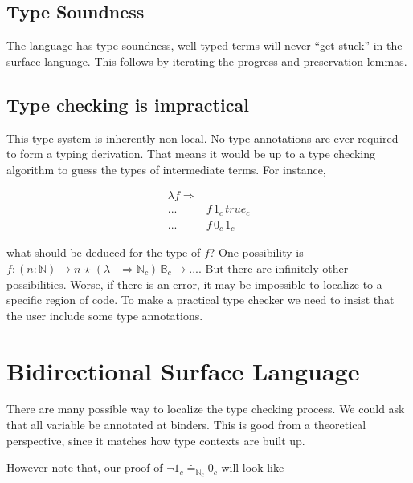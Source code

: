 \subsection{Type Soundness}

The language has type soundness, well typed terms will never ``get
stuck'' in the surface language. This follows by iterating the progress
and preservation lemmas.




\subsection{Type checking is impractical}

This type system is inherently non-local. No type annotations are
ever required to form a typing derivation. That means it would be
up to a type checking algorithm to guess the types of intermediate
terms. For instance, 

\begin{align*}
\lambda f\Rightarrow & \,\\
... & f\,1_{c}\,true_{c}\\
... & f\,0_{c}\,1_{c}
\end{align*}

what should be deduced for the type of $f$? One possibility is $f:\left(n:\mathbb{N}\right)\rightarrow n\,\star\,\left(\lambda-\Rightarrow\mathbb{N}_{c}\right)\,\mathbb{B}_{c}\rightarrow...$.
But there are infinitely other possibilities. Worse, if there is an
error, it may be impossible to localize to a specific region of code.
To make a practical type checker we need to insist that the user include
some type annotations.

\section{Bidirectional Surface Language}


There are many possible way to localize the type checking process.
We could ask that all variable be annotated at binders. This is good
from a theoretical perspective, since it matches how type contexts
are built up.

However note that, our proof of $\lnot1_{c}\doteq_{\mathbb{N}_{c}}0_{c}$
will look like

